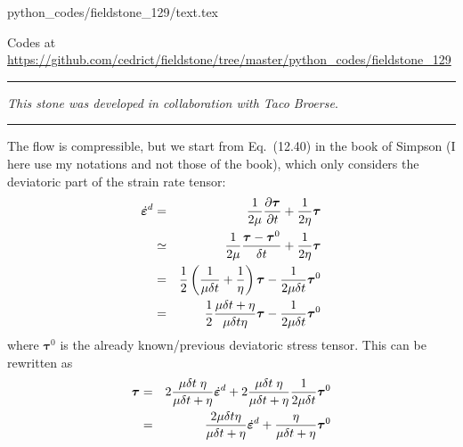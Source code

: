 \begin{flushright} {\tiny {\color{gray} python\_codes/fieldstone\_129/text.tex}} \end{flushright}



\begin{center}
Codes at \url{https://github.com/cedrict/fieldstone/tree/master/python_codes/fieldstone_129}
\end{center}

\par\noindent\rule{\textwidth}{0.4pt}

{\sl This stone was developed in collaboration with Taco Broerse}. 

\par\noindent\rule{\textwidth}{0.4pt}

The flow is compressible, but 
we start from Eq.~(12.40) in the book of Simpson (I here use my notations
and not those of the book), which only considers the deviatoric part of the 
strain rate tensor:
\begin{eqnarray}
\dot{\bm\varepsilon}^d
&=&\frac{1}{2\mu} \frac{\partial \bm\tau}{\partial t}
+\frac{1}{2\eta} \bm\tau \nonumber\\
&\simeq&
\frac{1}{2\mu} \frac{\bm\tau - \bm\tau^0}{\delta t}
+\frac{1}{2\eta} \bm\tau \nonumber\\
&=&
\frac12 \left( \frac{1}{\mu \delta t} + \frac{1}{\eta} \right) {\bm\tau}
-\frac{1}{2\mu \delta t} \bm\tau^0\nonumber\\
&=&
\frac12 \frac{ \mu\delta t +\eta}{\mu \delta t \eta}  {\bm\tau}
-\frac{1}{2\mu \delta t} \bm\tau^0
\end{eqnarray}
where ${\bm \tau}^0$ is the already known/previous deviatoric stress tensor. This can be rewritten as
\begin{eqnarray}
\bm\tau 
&=&
2  \frac{\mu \delta t \; \eta}{ \mu\delta t +\eta} \dot{\bm\varepsilon}^d 
+
2 \frac{\mu \delta t \; \eta}{\mu\delta t + \eta} \frac{1}{2\mu \delta t} \bm\tau^0
\nonumber\\
&=&
\frac{2 \mu \delta t \eta}{ \mu\delta t +\eta} \dot{\bm\varepsilon}^d 
+
\frac{ \eta}{\mu\delta t + \eta}  \bm\tau^0 \label{tau_simp1}
\end{eqnarray}

